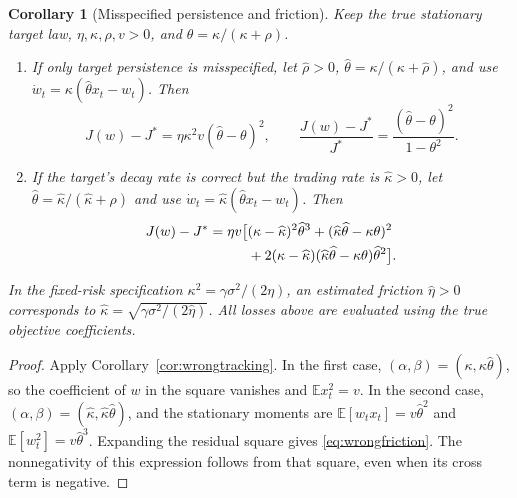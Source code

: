 \documentclass[11pt]{article}
\theoremstyle{plain}
\newtheorem{corollary}[theorem]{Corollary}
\theoremstyle{definition}
\theoremstyle{remark}
\newcommand{\E}{\mathbb E}
\begin{document}
\begin{corollary}[Misspecified persistence and friction]
\label{cor:wrongprimitives}
Keep the true stationary target law, \(\eta,\kappa,\rho,v>0\), and
\(\theta=\kappa/(\kappa+\rho)\).
\begin{enumerate}
\item If only target persistence is misspecified, let
\(\widehat\rho>0\),
\(\widehat\theta=\kappa/(\kappa+\widehat\rho)\), and use
\(\dot w_t=\kappa(\widehat\theta x_t-w_t)\). Then
\begin{equation}\label{eq:wrongpersistence}
J(w)-J^\ast=\eta\kappa^2v(\widehat\theta-\theta)^2,
\qquad
\frac{J(w)-J^\ast}{J^\ast}
=\frac{(\widehat\theta-\theta)^2}{1-\theta^2}.
\end{equation}
\item If the target's decay rate is correct but the trading rate is
\(\widehat\kappa>0\), let
\(\widehat\theta=\widehat\kappa/(\widehat\kappa+\rho)\) and use
\(\dot w_t=\widehat\kappa(\widehat\theta x_t-w_t)\). Then
\begin{align}
J(w)-J^\ast=\eta v\big[&
 (\kappa-\widehat\kappa)^2\widehat\theta^3
 +(\widehat\kappa\widehat\theta-\kappa\theta)^2\notag\\
 &+2(\kappa-\widehat\kappa)
       (\widehat\kappa\widehat\theta-\kappa\theta)
          \widehat\theta^2\big].\label{eq:wrongfriction}
\end{align}
\end{enumerate}
In the fixed-risk specification
\(\kappa^2=\gamma\sigma^2/(2\eta)\), an estimated friction
\(\widehat\eta>0\) corresponds to
\(\widehat\kappa=\sqrt{\gamma\sigma^2/(2\widehat\eta)}\).
All losses above are evaluated using the true objective coefficients.
\end{corollary}
\begin{proof}
Apply Corollary~\ref{cor:wrongtracking}. In the first case,
\((\alpha,\beta)=(\kappa,\kappa\widehat\theta)\), so the coefficient
of \(w\) in the square vanishes and \(\E x_t^2=v\).
In the second case,
\((\alpha,\beta)=(\widehat\kappa,\widehat\kappa\widehat\theta)\),
and the stationary moments are
\(\E[w_tx_t]=v\widehat\theta^2\) and
\(\E[w_t^2]=v\widehat\theta^3\). Expanding the residual square
gives \eqref{eq:wrongfriction}. The nonnegativity of this expression
follows from that square, even when its cross term is negative.
\end{proof}
\end{document}
